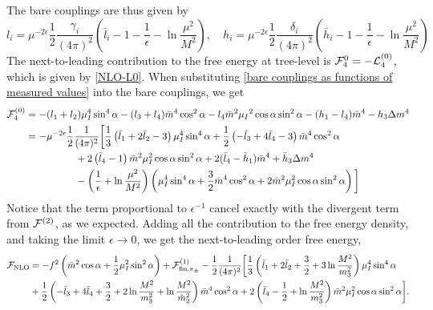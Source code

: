 The bare couplings are thus given by
\begin{equation}
    \label{bare couplings as functions of measured values}
    l_i = \mu^{-2\epsilon} \frac{1}{2} \frac{\gamma_i}{(4 \pi)^2}
    \left(
        \bar l_i -1- \frac{1}{\epsilon} - \ln\frac{\mu^2}{M^2}
    \right), 
    \quad
    h_i = \mu^{-2\epsilon} \frac{1}{2} \frac{\delta_i}{(4 \pi)^2}
    \left(
        \bar h_i - 1 - \frac{1}{\epsilon} - \ln\frac{\mu^2}{M^2}
    \right)
\end{equation}
The next-to-leading contribution to the free energy at tree-level is $\mathcal{F}_4^{0} = - \mathcal{L}_4^{(0)}$, which is given by \cref{NLO-L0}.
When substituting \autoref{bare couplings as functions of measured values} into the bare couplings, we get
\begin{align*}
    \mathcal{F}^{(0)}_4
    & = 
    - (l_1 + l_2)\mu_I^4 \sin^4{\alpha}
    - (l_3 + l_4)\bar m^4 \cos^2{\alpha}
    - l_4 \bar m^2 \mu_I{}^2 \cos{\alpha} \sin^2{\alpha}
    -(h_1- l_4) \bar m^4
    - h_3 \Delta m^4
    \\
    & = 
    - \mu^{-2 \epsilon} \frac{1}{2} \frac{1}{(4 \pi)^2}
    \bigg[
        \frac{1}{3}
        \left( 
            \bar l_1 + 2 \bar l_2 - 3
        \right) \mu_I^4 \sin^4 \alpha
        +
        \frac{1}{2}
        \left(
            - \bar l_3 + 4 \bar l_4 - 3
        \right) \bar m^4 \cos^2\alpha
        \\
        & \quad \quad \quad \quad \quad
        + 2 \left(\bar l_4 - 1\right)
        \bar m^2 \mu_I^2 \cos\alpha \sin^2 \alpha
        + 2 (\bar l_4 - \bar h_1) \bar m^4
        + \bar h_3 \Delta m^4
        \\
        & \quad \quad \quad \quad \quad
        - 
        \left(\frac{1}{\epsilon} + \ln \frac{\mu^2}{M^2}\right) 
        \left(
            \mu_I^4\sin^4\alpha + \frac{3}{2} \bar m^4 \cos^2 \alpha
            + 2 \bar m^2 \mu_I^2 \cos\alpha \sin^2 \alpha
        \right) 
    \bigg] 
\end{align*}
Notice that the term proportional to $\epsilon^{-1}$ cancel exactly with the divergent term from $\mathcal{F}^{(2)}$, as we expected.
Adding all the contribution to the free energy density, and taking the limit $\epsilon \rightarrow 0$, we get the next-to-leading order free energy,
\begin{align}
    \nonumber
    \Ef_{\mathrm{NLO}} &=
    - f^2 \left(\bar m^2 \cos \alpha + \frac{1}{2}\mu_I^2 \sin^2 \alpha\right)
    + \Ef^{(1)}_{\mathrm{fin}, \pi_\pm}
    - \frac{1}{2}\frac{1}{(4 \pi)^2}
    \bigg[
        \frac{1}{3}
        \left( 
            \bar l_1 + 2 \bar l_2 + \frac{3}{2} + 3 \ln \frac{M^2}{m_3^2}
        \right) \mu_I^4 \sin^4 \alpha
        \\ %
        &
        +
        \frac{1}{2}
        \left(
            - \bar l_3 + 4 \bar l_4 + \frac{3}{2} + 2\ln \frac{M^2}{m_3^2}
            + \ln \frac{M^2}{\tilde m^2_2}
        \right) \bar m^4 \cos^2\alpha 
        + 2 \left(\bar l_4 - \frac{1}{2} + \ln \frac{M^2}{m_3^2}\right)
        \bar m^2 \mu_I^2 \cos\alpha \sin^2 \alpha
        \label{NLO free energy}
    \bigg].
\end{align}
